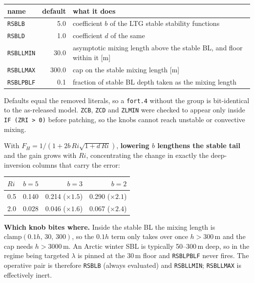 \documentclass[10pt]{article}
\begin{document}
\begin{center}\small
\begin{tabular}{lrp{}}
\toprule
name & default & what it does \\
\midrule
\texttt{RSBLB}    & 5.0   & coefficient $b$ of the LTG stable stability functions \\
\texttt{RSBLD}    & 1.0   & coefficient $d$ of the same \\
\texttt{RSBLLMIN} & 30.0  & asymptotic mixing length above the stable BL, and floor within it [m] \\
\texttt{RSBLLMAX} & 300.0 & cap on the stable mixing length [m] \\
\texttt{RSBLPBLF} & 0.1   & fraction of stable BL depth taken as the mixing length \\
\bottomrule
\end{tabular}
\end{center}

Defaults equal the removed literals, so a \texttt{fort.4} without the group is
bit-identical to the as-released model. \texttt{ZCB}, \texttt{ZCD} and \texttt{ZLMIN} were
checked to appear only inside \texttt{IF (ZRI > 0)} before patching, so the knobs cannot
reach unstable or convective mixing.

With $F_H = 1/(1+2b\,Ri\sqrt{1+d\,Ri})$, \textbf{lowering $b$ lengthens the stable tail}
and the gain grows with $Ri$, concentrating the change in exactly the deep-inversion
columns that carry the error:

\begin{center}\small
\begin{tabular}{lrrr}
\toprule
$Ri$ & $b=5$ & $b=3$ & $b=2$ \\
\midrule
0.5 & 0.140 & 0.214 ($\times1.5$) & 0.290 ($\times2.1$) \\
2.0 & 0.028 & 0.046 ($\times1.6$) & 0.067 ($\times2.4$) \\
\bottomrule
\end{tabular}
\end{center}

\textbf{Which knob bites where.} Inside the stable BL the mixing length is
$\text{clamp}(0.1h,\,30,\,300)$, so the $0.1h$ term only takes over once $h>300$\,m and
the cap needs $h>3000$\,m. An Arctic winter SBL is typically 50--300\,m deep, so in the
regime being targeted $\lambda$ is pinned at the 30\,m floor and \texttt{RSBLPBLF} never
fires. The operative pair is therefore \texttt{RSBLB} (always evaluated) and
\texttt{RSBLLMIN}; \texttt{RSBLLMAX} is effectively inert.
\end{document}
